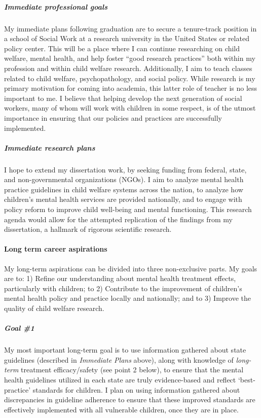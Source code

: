 \documentclass[twocolumn, serif, rga, authordate]{jote-article}
\begin{document}
\subparagraph{Immediate professional goals} My immediate plans following
graduation are to secure a tenure-track position in a school of Social
Work at a research university in the United States or related policy
center. This will be a place where I can continue researching on child
welfare, mental health, and help foster ``good research practices'' both
within my profession and within child welfare research. Additionally, I
aim to teach classes related to child welfare, psychopathology, and
social policy. While research is my primary motivation for coming into
academia, this latter role of teacher is no less important to me. I
believe that helping develop the next generation of social workers, many
of whom will work with children in some respect, is of the utmost
importance in ensuring that our policies and practices are successfully
implemented.

\subparagraph{Immediate research plans} I hope to extend my dissertation
work, by seeking funding from federal, state, and non-governmental
organizations (NGOs). I aim to analyze mental health practice guidelines
in child welfare systems across the nation, to analyze how children's
mental health services are provided nationally, and to engage with
policy reform to improve child well-being and mental functioning. This
research agenda would allow for the attempted replication of the
findings from my dissertation, a hallmark of rigorous scientific
research.


\paragraph{Long term career aspirations}


My long-term aspirations can be divided into three non-exclusive parts.
My goals are to: 1) Refine our understanding about mental health
treatment effects, particularly with children; to 2) Contribute to the
improvement of children's mental health policy and practice locally and
nationally; and to 3) Improve the quality of child welfare research.

\subparagraph{Goal \#1} My most important long-term goal is to use
information gathered about state guidelines (described in
\emph{Immediate Plans} above), along with knowledge of \emph{long-term}
treatment efficacy/safety (see point 2 below), to ensure that the mental
health guidelines utilized in each state are truly evidence-based and
reflect `best-practice' standards for children. I plan on using
information gathered about discrepancies in guideline adherence to
ensure that these improved standards are effectively implemented with
all vulnerable children, once they are in place.
\end{document}
